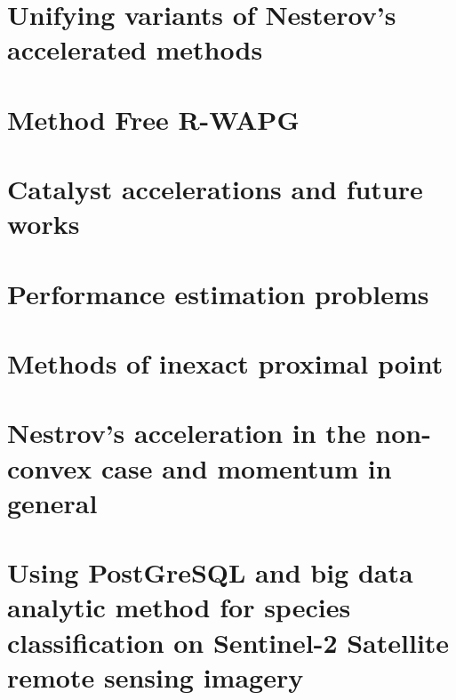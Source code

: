 \documentclass[12pt]{article}
\begin{document}
\section{Unifying variants of Nesterov's accelerated methods}\label{sec:unify-nes-acceleration}


\section{Method Free R-WAPG}\label{sec:spectral-momentum}

\section{Catalyst accelerations and future works}\label{sec:catalyst}

\section{Performance estimation problems}\label{sec:pep}

\section{Methods of inexact proximal point}\label{sec:inexact-prox}

\section{Nestrov's acceleration in the non-convex case and momentum in general}\label{sec:nes-acc-ncnvx}

\section{Using PostGreSQL and big data analytic method for species classification on Sentinel-2 Satellite remote sensing imagery}




\newpage

\appendix
\end{document}
